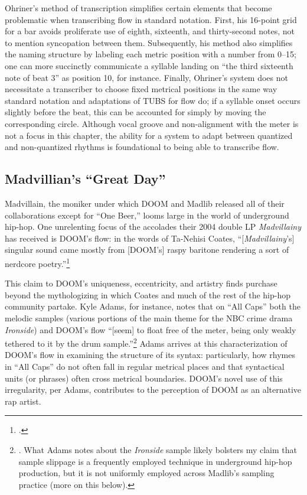Ohriner's method of transcription simplifies certain elements that become problematic when transcribing 
flow in standard notation. First, his 16-point grid for a bar avoids proliferate use of eighth, sixteenth,
and thirty-second notes, not to mention syncopation between them. Subsequently, his method also simplifies 
the naming structure by labeling each metric position with a number from 0--15; one can more succinctly
communicate a syllable landing on ``the third sixteenth note of beat 3'' as position 10, for instance. 
Finally, Ohriner's system does not necessitate a transcriber to choose fixed metrical positions in the 
same way standard notation and adaptations of TUBS for flow do; if a syllable onset occurs slightly before
the beat, this can be accounted for simply by moving the corresponding circle. Although vocal groove and
non-alignment with the meter is not a focus in this chapter, the ability for a system to adapt between
quantized and non-quantized rhythms is foundational to being able to transcribe flow.

\subsection*{\centering Madvillian's ``Great Day''}

Madvillain, the moniker under which DOOM and Madlib released all of their collaborations except for
``One Beer,'' looms large in the world of underground hip-hop. One unrelenting focus of the accolades
their 2004 double LP \textit{Madvillainy} has received is DOOM's flow: in the words of Ta-Nehisi Coates,
``[\textit{Madvillainy}'s] singular sound came mostly from [DOOM's] raspy baritone rendering a sort of
nerdcore poetry.''\footnote{
    \cite{ta-nehisicoatesMaskDoomNonconformist2009}.}

This claim to DOOM's uniqueness, eccentricity, and artistry finds purchase beyond the mythologizing in
which Coates and much of the rest of the hip-hop community partake. Kyle Adams, for instance, notes that
on ``All Caps'' both the melodic samples (various portions of the main theme for the NBC crime drama 
\textit{Ironside}) and DOOM's flow ``[seem] to float free of the meter, being only weakly tethered to
it by the drum sample.''\footnote{
    \cite{kyleadamsMetricalTechniquesFlow2009}. What Adams notes about the \textit{Ironside} sample likely
    bolsters my claim that sample slippage is a frequently employed technique in underground hip-hop production,
    but it is not uniformly employed across Madlib's sampling practice (more on this below).}
Adams arrives at this characterization of DOOM's flow in examining the structure of its syntax: particularly,
how rhymes in ``All Caps'' do not often fall in regular metrical places and that syntactical units (or phrases) 
often cross metrical boundaries. DOOM's novel use of this irregularity, per Adams, contributes to the perception
of DOOM as an alternative rap artist.

